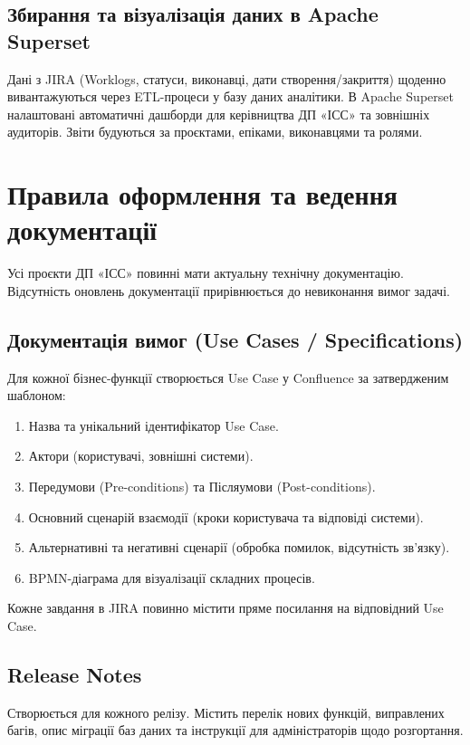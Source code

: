 \documentclass{article}
\begin{document}
\subsection{Збирання та візуалізація даних в Apache Superset}
Дані з JIRA (Worklogs, статуси, виконавці, дати створення/закриття) щоденно вивантажуються через ETL-процеси у базу даних аналітики. В Apache Superset налаштовані автоматичні дашборди для керівництва ДП «ІСС» та зовнішніх аудиторів. Звіти будуються за проєктами, епіками, виконавцями та ролями.

\section{Правила оформлення та ведення документації}

Усі проєкти ДП «ІСС» повинні мати актуальну технічну документацію. Відсутність оновлень документації прирівнюється до невиконання вимог задачі.

\subsection{Документація вимог (Use Cases / Specifications)}
Для кожної бізнес-функції створюється Use Case у Confluence за затвердженим шаблоном:
\begin{enumerate}
    \item Назва та унікальний ідентифікатор Use Case.
    \item Актори (користувачі, зовнішні системи).
    \item Передумови (Pre-conditions) та Післяумови (Post-conditions).
    \item Основний сценарій взаємодії (кроки користувача та відповіді системи).
    \item Альтернативні та негативні сценарії (обробка помилок, відсутність зв'язку).
    \item BPMN-діаграма для візуалізації складних процесів.
\end{enumerate}
Кожне завдання в JIRA повинно містити пряме посилання на відповідний Use Case.

\subsection{Release Notes}
Створюється для кожного релізу. Містить перелік нових функцій, виправлених багів, опис міграції баз даних та інструкції для адміністраторів щодо розгортання.
\end{document}
